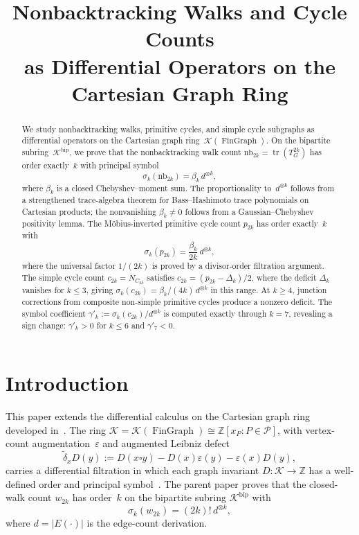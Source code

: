 \documentclass[11pt]{amsart}
\title[Nonbacktracking Walks and Cycle Counts]{Nonbacktracking Walks and Cycle Counts\\as Differential Operators on the Cartesian Graph Ring}
\author{}
\date{}
\newcommand{\K}{\mathcal{K}}
\newcommand{\ZZ}{\mathbb{Z}}
\newcommand{\PP}{\mathcal{P}}
\newcommand{\tr}{\operatorname{tr}}
\newcommand{\nb}{\mathrm{nb}}
\DeclareMathOperator{\FinGraph}{FinGraph}
\theoremstyle{definition}
\theoremstyle{remark}
\begin{document}
\begin{abstract}
We study nonbacktracking walks, primitive cycles, and simple cycle subgraphs as differential operators on the Cartesian graph ring~$\K(\FinGraph)$. On the bipartite subring~$\K^{\mathrm{bip}}$, we prove that the nonbacktracking walk count $\nb_{2k}=\tr(T_G^{2k})$ has order exactly~$k$ with principal symbol
\[
   \sigma_k(\nb_{2k})=\beta_k\,d^{\otimes k},
\]
where $\beta_k$ is a closed Chebyshev--moment sum. The proportionality to~$d^{\otimes k}$ follows from a strengthened trace-algebra theorem for Bass--Hashimoto trace polynomials on Cartesian products; the nonvanishing $\beta_k\ne0$ follows from a Gaussian--Chebyshev positivity lemma. The M\"obius-inverted primitive cycle count $p_{2k}$ has order exactly~$k$ with
\[
   \sigma_k(p_{2k})=\frac{\beta_k}{2k}\,d^{\otimes k},
\]
where the universal factor $1/(2k)$ is proved by a divisor-order filtration argument. The simple cycle count $c_{2k}=N_{C_{2k}}$ satisfies $c_{2k}=(p_{2k}-\Delta_k)/2$, where the deficit $\Delta_k$ vanishes for $k\le3$, giving $\sigma_k(c_{2k})=\beta_k/(4k)\,d^{\otimes k}$ in this range. At $k\ge4$, junction corrections from composite non-simple primitive cycles produce a nonzero deficit. The symbol coefficient $\gamma'_k:=\sigma_k(c_{2k})/d^{\otimes k}$ is computed exactly through $k=7$, revealing a sign change: $\gamma'_k>0$ for $k\le6$ and $\gamma'_7<0$.
\end{abstract}
\maketitle

\tableofcontents

\section{Introduction}

This paper extends the differential calculus on the Cartesian graph ring developed in~\cite{RG}. The ring $\K=\K(\FinGraph)\cong\ZZ[x_P:P\in\PP]$, with vertex-count augmentation~$\varepsilon$ and augmented Leibniz defect
\[
\widetilde\delta_xD(y):=D(x\square y)-D(x)\varepsilon(y)-\varepsilon(x)D(y),
\]
carries a differential filtration in which each graph invariant $D:\K\to\ZZ$ has a well-defined order and principal symbol~\cite[\S3]{RG}. The parent paper proves that the closed-walk count $w_{2k}$ has order~$k$ on the bipartite subring $\K^{\mathrm{bip}}$ with
\[
   \sigma_k(w_{2k})=(2k)!\,d^{\otimes k},
\]
where $d=|E(\cdot)|$ is the edge-count derivation.
\end{document}
